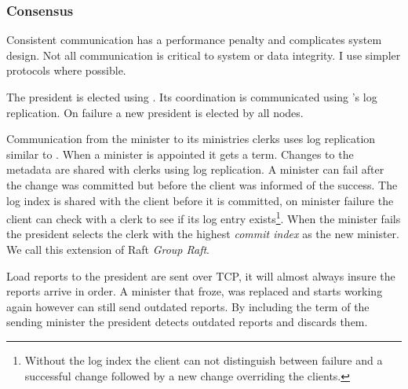\subsubsection*{Consensus} \label{sec:concensus} \label{sec:praft}
Consistent communication has a performance penalty and complicates system design. Not all communication is critical to system or data integrity. I use simpler protocols where possible. 

The president is elected using \raft{}. Its coordination is communicated using \raft{}'s log replication. On failure a new president is elected by all nodes.

Communication from the minister to its ministries clerks uses log replication similar to \raft{}. When a minister is appointed it gets a \raft{} term. Changes to the metadata are shared with clerks using log replication. A minister can fail after the change was committed but before the client was informed of the success. The log index is shared with the client before it is committed, on minister failure the client can check with a clerk to see if its log entry exists\footnote{Without the log index the client can not distinguish between failure and a successful change followed by a new change overriding the clients.}. When the minister fails the president selects the clerk with the highest \textsl{commit index} as the new minister. We call this extension of Raft \textit{Group Raft}.

Load reports to the president are sent over TCP, it will almost always insure the reports arrive in order. A minister that froze, was replaced and starts working again however can still send outdated reports. By including the term of the sending minister the president detects outdated reports and discards them.
%
